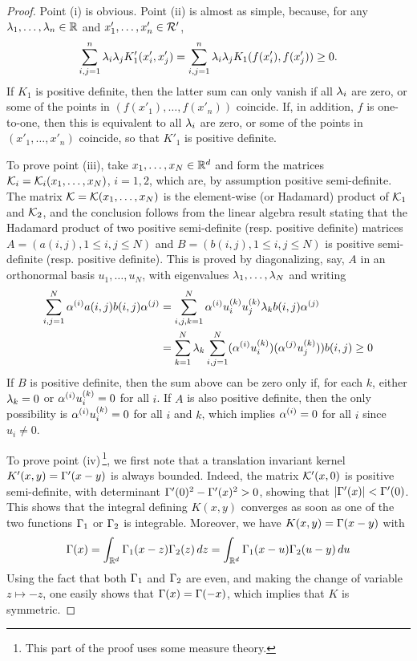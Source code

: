 \begin{proof}
Point (i) is obvious. Point (ii) is almost as simple, because, for any $\lambda_1, \ldots, \lambda_n\in {\mathbb{R}}$ and $x'_1, \ldots, x'_n\in {\mathcal R}'$,
\[
\sum_{i,j=1}^n \lambda_i\lambda_j K'_1(x'_i, x'_j) = \sum_{i,j=1}^n \lambda_i\lambda_j K_1(f(x'_i), f(x'_j))\geq 0.
\]
If $K_1$ is positive definite, then the latter sum can only vanish if all $\lambda_i$ are zero, or some of the points in $(f(x'_1), \ldots, f(x'_n))$ coincide. If, in addition, $f$ is one-to-one, then this is equivalent to all $\lambda_i$ are zero, or some of the points in $(x'_1, \ldots, x'_n)$ coincide, so that $K'_1$ is positive definite.



To prove point  (iii), take $x_1, \ldots, x_N\in {\mathbb{R}}^d$ and form the matrices ${\mathcal K}_i = {\mathcal K}_i(x_1, \ldots, x_N)$, $i=1,2$, which are, by assumption positive semi-definite. The matrix ${\mathcal K} = {\mathcal K}(x_1, \ldots, x_N)$ is the element-wise (or Hadamard) product of ${\mathcal K}_1$ and ${\mathcal K}_2$, and the conclusion follows from the linear algebra result stating that the Hadamard product of two positive semi-definite (resp. positive definite) matrices $A = (a(i,j), 1\leq i,j\leq N)$ and $B= (b(i,j), 1\leq i,j\leq N)$ is positive semi-definite (resp. positive definite). This is proved by diagonalizing, say, $A$ in an orthonormal basis $u_1, \ldots, u_N$, with eigenvalues $\lambda_1, \ldots, \lambda_N$ and writing
\begin{align*}
\sum_{i,j=1}^N \alpha^{(i)} a(i,j)b(i,j)\alpha^{(j)} & = \sum_{i,j, k=1}^N \alpha^{(i)} u_i^{(k)} u_j^{(k)} \lambda_k b(i,j)\alpha^{(j)}\\
& = \sum_{k=1}^N \lambda_k \sum_{i,j=1}^N (\alpha^{(i)} u_i^{(k)}) (\alpha^{(j)} u_j^{(k)})) b(i,j) \geq 0
\end{align*}
If $B$ is positive definite, then the sum above can be zero only if, for each $k$, either $\lambda_k=0$ or $\alpha^{(i)} u_i^{(k)} = 0$ for all $i$. If $A$ is also positive definite, then the only possibility is $\alpha^{(i)} u_i^{(k)} = 0$ for all $i$ and $k$, which implies $\alpha^{(i)}=0$ for all $i$ since $u_i\neq 0$. 

To prove point (iv)\,\footnote{This part of the proof uses some measure theory.}, we first note that a translation invariant kernel $K'(x,y) = \Gamma'(x-y)$ is always bounded. Indeed, the matrix ${\mathcal K}'(x,0)$ is positive semi-definite, with determinant $\Gamma'(0)^2 - \Gamma'(x)^2 >0$, showing that $|\Gamma'(x)| < \Gamma'(0)$. 
This shows that the integral defining $K(x,y)$ converges as soon as one of the two functions $\Gamma_1$ or $\Gamma_2$ is integrable. Moreover, we have 
$K(x,y) = \Gamma(x-y)$ with
\[
\Gamma(x) = \int_{{\mathbb{R}}^d} \Gamma_1(x-z) \Gamma_2(z)\,dz = \int_{{\mathbb{R}}^d} \Gamma_1(x-u) \Gamma_2(u-y)\,du
\]
Using the fact that both $\Gamma_1$ and $\Gamma_2$ are even, and making the change of variable $z\mapsto -z$, one easily shows that $\Gamma(x) = \Gamma(-x)$, which implies that $K$ is symmetric. 


\end{proof}
